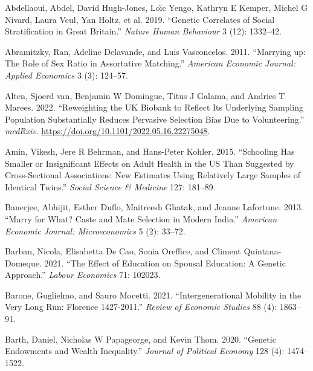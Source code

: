 \documentclass[
  12pt,
]{article}
\newlength{\cslhangindent}
\newlength{\cslentryspacingunit} %
\newenvironment{CSLReferences}[2] %
 {%
  \setlength{\parindent}{0pt}
  \ifodd #1
  \let\oldpar\par
  \def\par{\hangindent=\cslhangindent\oldpar}
  \fi
  \setlength{\parskip}{#2\cslentryspacingunit}
 }%
 {}
\theoremstyle{definition}
\theoremstyle{definition}
\theoremstyle{definition}
\theoremstyle{definition}
\theoremstyle{remark}
\begin{document}
\hypertarget{refs}{}
\begin{CSLReferences}{1}{0}
\leavevmode{}%
Abdellaoui, Abdel, David Hugh-Jones, Loı̈c Yengo, Kathryn E Kemper, Michel G Nivard, Laura Veul, Yan Holtz, et al. 2019. {``Genetic Correlates of Social Stratification in Great Britain.''} \emph{Nature Human Behaviour} 3 (12): 1332--42.

\leavevmode{}%
Abramitzky, Ran, Adeline Delavande, and Luis Vasconcelos. 2011. {``Marrying up: The Role of Sex Ratio in Assortative Matching.''} \emph{American Economic Journal: Applied Economics} 3 (3): 124--57.

\leavevmode{}%
Alten, Sjoerd van, Benjamin W Domingue, Titus J Galama, and Andries T Marees. 2022. {``Reweighting the UK Biobank to Reflect Its Underlying Sampling Population Substantially Reduces Pervasive Selection Bias Due to Volunteering.''} \emph{medRxiv}. \url{https://doi.org/10.1101/2022.05.16.22275048}.

\leavevmode{}%
Amin, Vikesh, Jere R Behrman, and Hans-Peter Kohler. 2015. {``Schooling Has Smaller or Insignificant Effects on Adult Health in the US Than Suggested by Cross-Sectional Associations: New Estimates Using Relatively Large Samples of Identical Twins.''} \emph{Social Science \& Medicine} 127: 181--89.

\leavevmode{}%
Banerjee, Abhijit, Esther Duflo, Maitreesh Ghatak, and Jeanne Lafortune. 2013. {``Marry for What? Caste and Mate Selection in Modern India.''} \emph{American Economic Journal: Microeconomics} 5 (2): 33--72.

\leavevmode{}%
Barban, Nicola, Elisabetta De Cao, Sonia Oreffice, and Climent Quintana-Domeque. 2021. {``The Effect of Education on Spousal Education: A Genetic Approach.''} \emph{Labour Economics} 71: 102023.

\leavevmode{}%
Barone, Guglielmo, and Sauro Mocetti. 2021. {``Intergenerational Mobility in the Very Long Run: Florence 1427-2011.''} \emph{Review of Economic Studies} 88 (4): 1863--91.

\leavevmode{}%
Barth, Daniel, Nicholas W Papageorge, and Kevin Thom. 2020. {``Genetic Endowments and Wealth Inequality.''} \emph{Journal of Political Economy} 128 (4): 1474--1522.


\end{CSLReferences}
\end{document}

